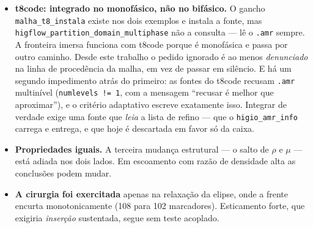 \begin{itemize}
\begin{enumerate}
        com barreira, e relido por todos (Se\c{c}\~ao~\ref{sec:paralelo}). Foi o
        conserto correto para a \emph{corre\c{c}\~ao}, e \'e um trecho serial
        proporcional \`a malha global a cada remalhamento.
    \end{enumerate}
    A consequ\^encia pr\'atica, e ela contraria a leitura natural: usar o t8code
    apenas como \emph{particionador} --- que \'e o caminho barato, porque
    \texttt{fonte\_de\_particao} j\'a existe --- melhoraria a qualidade da
    parti\c{c}\~ao e \textbf{n\~ao} entregaria o escalonamento, que \'e a raz\~ao
    de ser do t8code. Os tr\^es itens acima continuariam intactos. O que
    entregaria \'e a adapta\c{c}\~ao din\^amica distribu\'ida: crit\'erio avaliado
    localmente, floresta adaptada no lugar, e o \texttt{.amr} reduzido a formato
    de \emph{arranque} em vez de via de remalhamento. Isso \'e reescrever o
    caminho de remalhamento, n\~ao ligar um gancho.

    \textbf{Isso foi medido, e a infer\^encia caiu.} A
    Se\c{c}\~ao~\ref{sec:fase0} cronometra o remalhamento separado do resto em 1,
    2, 4 e 8 processos: ele custa entre \SI{0.06}{\percent} e \SI{0.10}{\percent}
    do tempo, e o trecho serial da escrita do \texttt{.amr} \'e \SI{3}{\percent}
    \emph{disso}. Os tr\^es gargalos s\~ao reais como fatos de c\'odigo e
    irrelevantes como custo, neste tamanho de problema. O que a medida encontrou
    no lugar \'e que a efici\^encia paralela cai a \SI{22}{\percent} em oito
    processos --- o caso \'e pequeno demais para o paralelismo render.
  \item \textbf{t8code: integrado no monof\'asico, n\~ao no bif\'asico.} O gancho
    \texttt{malha\_t8\_instala} existe nos dois exemplos e instala a fonte, mas
    \texttt{higflow\_\allowbreak{}partition\_\allowbreak{}domain\_\allowbreak{}multiphase} n\~ao a consulta --- l\^e o
    \texttt{.amr} sempre. A fronteira imersa funciona com t8code porque \'e
    monof\'asica e passa por outro caminho. Desde este trabalho o pedido
    ignorado \'e ao menos \emph{denunciado} na linha de proced\^encia da malha, em
    vez de passar em sil\^encio. E h\'a um segundo impedimento atr\'as do
    primeiro: as fontes do t8code recusam \texttt{.amr} multin\'ivel
    (\texttt{numlevels != 1}, com a mensagem ``recusar \'e melhor que
    aproximar''), e o crit\'erio adaptativo escreve exatamente isso. Integrar de
    verdade exige uma fonte que \emph{leia} a lista de refino --- que o
    \texttt{higio\_amr\_info} carrega e entrega, e que hoje \'e descartada em
    favor s\'o da caixa.
  \item \textbf{Propriedades iguais.} A terceira mudan\c{c}a estrutural --- o
    salto de $\rho$ e $\mu$ --- est\'a adiada nos dois lados. Em escoamento com
    raz\~ao de densidade alta as conclus\~oes podem mudar.
  \item \textbf{A cirurgia foi exercitada} apenas na relaxa\c{c}\~ao da elipse,
    onde a frente encurta monotonicamente (108 para 102 marcadores). Esticamento
    forte, que exigiria \emph{inser\c{c}\~ao} sustentada, segue sem teste
    acoplado.
\end{itemize}

